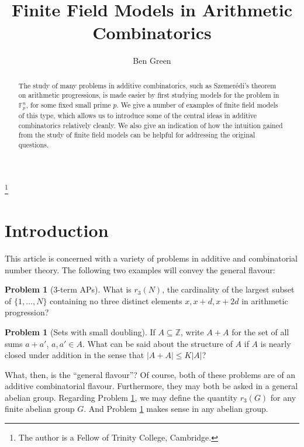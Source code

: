 \documentclass[12pt,a4paper,reqno]{amsart}
\numberwithin{equation}{section}
\theoremstyle{plain}
\theoremstyle{definition}
\newtheorem{problem}[subsection]{Problem}
\renewcommand{\leq}{\leqslant}
\begin{document}
\title{Finite Field Models in Arithmetic Combinatorics
}

\author{Ben Green}
\address{Trinity College\\
     Cambridge CB2 1TQ\\
     England
}


\thanks{The author is a Fellow of Trinity College, Cambridge.}


\begin{abstract}
The study of many problems in additive combinatorics, such as Szemer\'edi's theorem on arithmetic progressions, is made easier by first studying models for the problem in $\mathbb{F}_p^n$, for some fixed small prime $p$. We give a number of examples of finite field models of this type, which allows us to introduce some of the central ideas in additive combinatorics relatively cleanly. We also give an indication of how the intuition gained from the study of finite field models can be helpful for addressing the original questions.

\end{abstract}


\maketitle

\section{Introduction}\label{sec1}
\noindent This article is concerned with a variety of problems in additive and combinatorial number theory. The following two examples will convey the general flavour:
\begin{problem}[3-term APs]\label{prob1} What is $r_3(N)$, the cardinality of the largest subset of $\{1,\dots,N\}$ containing no three distinct elements $x,x+d,x+2d$ in arithmetic progression?\end{problem}
\begin{problem}[Sets with small doubling]\label{prob2} If $A \subseteq \mathbb{Z}$, write $A + A$ for the set of all sums $a + a'$, $a,a' \in A$. What can be said about the structure of $A$ if $A$ is nearly closed under addition in the sense that $|A + A| \leq K|A|$?\end{problem}
\noindent What, then, is the ``general flavour''? Of course, both of these problems are of an additive combinatorial flavour. Furthermore, they may both be asked in a general abelian group. Regarding Problem \ref{prob1}, we may define the quantity $r_3(G)$ for any finite abelian group $G$. And Problem \ref{prob2} makes sense in any abelian group.\vspace{11pt}
\end{document}
